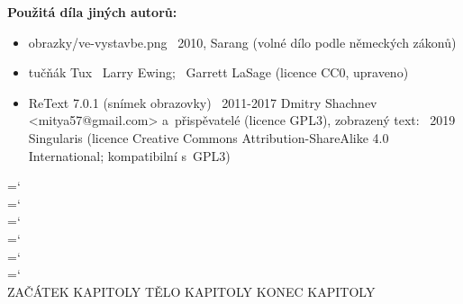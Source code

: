 \documentclass[10pt,final]{book}
\begin{document}
\noindent\textbf{Použitá díla jiných autorů:}
\begin{itemize}%
\item obrazky/ve-vystavbe.png \textcopyright~2010, Sarang (volné dílo podle německých zákonů)
\item tučňák Tux \textcopyright~Larry Ewing; \textcopyright~Garrett LaSage (licence CC0, upraveno)
\item ReText 7.0.1 (snímek obrazovky) \textcopyright~2011-2017 Dmitry Shachnev <mitya57@gmail.com> a přispěvatelé (licence GPL3), zobrazený text: \textcopyright~2019 Singularis (licence Creative Commons Attribution-ShareAlike 4.0 International; kompatibilní s GPL3)
\end{itemize}%
\vfill%
\clearpage%
%
\pagestyle{normalni}%
\renewcommand*{\contentsname}{OBSAH}%
\tableofcontents%
%
{%
    \selectfont\hyphenchar\font=`\\%
    \selectfont\hyphenchar\font=`\\%
    \selectfont\hyphenchar\font=`\\%
    \selectfont\hyphenchar\font=`\\%
    \selectfont\hyphenchar\font=`\\%
    \selectfont\hyphenchar\font=`\\%
}%
%
\clearpage%
\raggedbottom%
{{ZAČÁTEK KAPITOLY}}
{{TĚLO KAPITOLY}}
{{KONEC KAPITOLY}}
\end{document}
